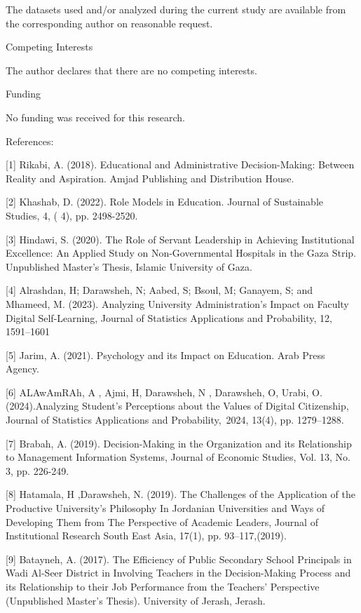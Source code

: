 \documentclass[10pt]{NSP1}
\begin{document}
The datasets used and/or analyzed during the current study are available from the corresponding author on reasonable request.

Competing Interests

The author declares that there are no competing interests.

Funding

No funding was received for this research.

References:

[1] Rikabi, A. (2018). Educational and Administrative Decision-Making: Between Reality and Aspiration. Amjad Publishing and Distribution House.

[2] Khashab, D. (2022). Role Models in Education. Journal of Sustainable Studies, 4, ( 4), pp. 2498-2520.

[3] Hindawi, S. (2020). The Role of Servant Leadership in Achieving Institutional Excellence: An Applied Study on Non-Governmental Hospitals in the Gaza Strip. Unpublished Master's Thesis, Islamic University of Gaza.

[4] Alrashdan, H; Darawsheh, N; Aabed, S; Bsoul, M; Ganayem, S; and Mhameed, M. (2023). Analyzing University Administration's Impact on Faculty Digital Self-Learning, Journal of Statistics Applications and Probability, 12, 1591--1601

[5] Jarim, A. (2021). Psychology and its Impact on Education. Arab Press Agency.

[6] ALAwAmRAh, A , Ajmi, H, Darawsheh, N , Darawsheh, O, Urabi, O.(2024).Analyzing Student's Perceptions about the Values of Digital Citizenship, Journal of Statistics Applications and Probability,~2024, 13(4), pp. 1279--1288.

[7] Brabah, A. (2019). Decision-Making in the Organization and its Relationship to Management Information Systems, Journal of Economic Studies, Vol. 13, No. 3, pp. 226-249.

[8] Hatamala, H ,Darawsheh, N. (2019). The Challenges of the Application of the Productive University's Philosophy In Jordanian Universities and Ways of Developing Them from The Perspective of Academic Leaders, Journal of Institutional Research South East Asia, 17(1), pp. 93--117,(2019).

[9] Batayneh, A. (2017). The Efficiency of Public Secondary School Principals in Wadi Al-Seer District in Involving Teachers in the Decision-Making Process and its Relationship to their Job Performance from the Teachers' Perspective (Unpublished Master's Thesis). University of Jerash, Jerash.
\end{document}
